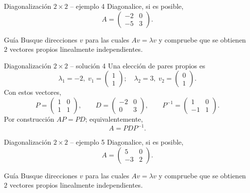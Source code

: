 \documentclass[aspectratio=169,10pt]{beamer}
\begin{document}
\begin{frame}{Diagonalización $2\times 2$ -- ejemplo 4}
\small
Diagonalice, si es posible,
\[
A=\begin{pmatrix}-2 & 0\\-5 & 3\end{pmatrix}.
\]
\begin{block}{Guía}
Busque direcciones $v$ para las cuales $Av=\lambda v$ y compruebe que se obtienen $2$ vectores propios linealmente independientes.
\end{block}
\end{frame}
\begin{frame}{Diagonalización $2\times 2$ -- solución 4}
\scriptsize
Una elección de pares propios es
\[
\lambda_1=-2,\;v_1=\begin{pmatrix}1\\1\end{pmatrix};\quad \lambda_2=3,\;v_2=\begin{pmatrix}0\\1\end{pmatrix}.
\]
Con estos vectores,
\[
P=\begin{pmatrix}1 & 0\\1 & 1\end{pmatrix},\qquad D=\begin{pmatrix}-2 & 0\\0 & 3\end{pmatrix},\qquad P^{-1}=\begin{pmatrix}1 & 0\\-1 & 1\end{pmatrix}.
\]
Por construcción $AP=PD$; equivalentemente,
\[
\boxed{A=PDP^{-1}}.
\]
\end{frame}
\begin{frame}{Diagonalización $2\times 2$ -- ejemplo 5}
\small
Diagonalice, si es posible,
\[
A=\begin{pmatrix}5 & 0\\-3 & 2\end{pmatrix}.
\]
\begin{block}{Guía}
Busque direcciones $v$ para las cuales $Av=\lambda v$ y compruebe que se obtienen $2$ vectores propios linealmente independientes.
\end{block}
\end{frame}
\end{document}
